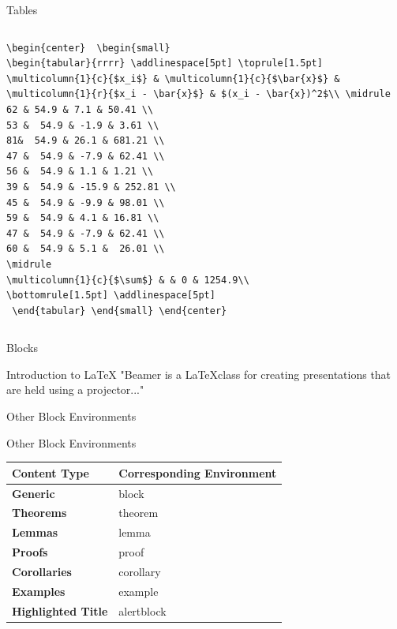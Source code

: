 \documentclass[mathserif, xcolor=svgnames]{beamer}
\begin{document}
\begin{frame}{Tables}
\begin{columns}
\begin{column}{2in}
\begin{scriptsize}
\begin{verbatim}
\begin{center}  \begin{small}
\begin{tabular}{rrrr} \addlinespace[5pt] \toprule[1.5pt]
\multicolumn{1}{c}{$x_i$} & \multicolumn{1}{c}{$\bar{x}$} &
\multicolumn{1}{r}{$x_i - \bar{x}$} & $(x_i - \bar{x})^2$\\ \midrule
62 & 54.9 & 7.1 & 50.41 \\
53 &  54.9 & -1.9 & 3.61 \\
81&  54.9 & 26.1 & 681.21 \\
47 &  54.9 & -7.9 & 62.41 \\
56 &  54.9 & 1.1 & 1.21 \\
39 &  54.9 & -15.9 & 252.81 \\
45 &  54.9 & -9.9 & 98.01 \\
59 &  54.9 & 4.1 & 16.81 \\
47 &  54.9 & -7.9 & 62.41 \\
60 &  54.9 & 5.1 &  26.01 \\
\midrule
\multicolumn{1}{c}{$\sum$} & & 0 & 1254.9\\
\bottomrule[1.5pt] \addlinespace[5pt]
 \end{tabular} \end{small} \end{center}
 \end{verbatim}
 \end{scriptsize}
\end{column}

\end{columns}
\end{frame}

\begin{frame}{Blocks}
\begin{block}{Introduction to {\LaTeX}}
"Beamer is a {\LaTeX}class for creating presentations that are held using a projector..."
\end{block}
\end{frame}

\begin{frame}{Other Block Environments}
\begin{block}{Other Block Environments}
\begin{tabular}{l|l} 
\textbf{Content Type} & \textbf{Corresponding Environment}\\\hline
\textbf{Generic} & block\\
\textbf{Theorems} & theorem\\
\textbf{Lemmas} & lemma\\
\textbf{Proofs} & proof\\
\textbf{Corollaries} & corollary\\
\textbf{Examples} & example\\
\textbf{Highlighted Title} &alertblock\\
\end{tabular}
\end{block}
\end{frame}
\end{document}
